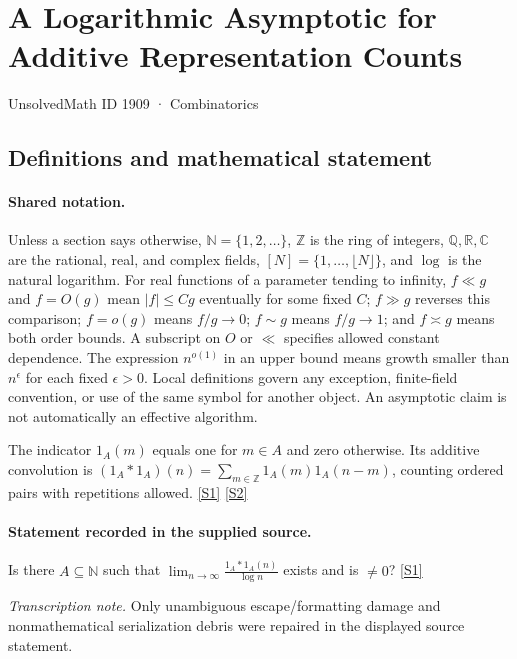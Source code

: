 \documentclass[11pt,a4paper]{article}
\newcommand{\N}{\mathbb{N}}
\newcommand{\Z}{\mathbb{Z}}
\newcommand{\Q}{\mathbb{Q}}
\newcommand{\R}{\mathbb{R}}
\newcommand{\C}{\mathbb{C}}
\newcommand{\sref}[2]{\hyperlink{source:#1:#2}{[S#2]}}
\begin{document}

\setcounter{section}{1908}

\section{A Logarithmic Asymptotic for Additive Representation Counts}\label{1909}

{\small\sffamily UnsolvedMath ID 1909 · Combinatorics}

\subsection{Definitions and mathematical statement}

\paragraph{Shared notation.}Unless a section says otherwise, $\N=\{1,2,\ldots\}$,
$\Z$ is the ring of integers, $\Q,\R,\C$ are the rational, real, and complex
fields, $[N]=\{1,\ldots,\lfloor N\rfloor\}$, and $\log$ is the natural
logarithm. For real functions of a parameter tending to infinity,
$f\ll g$ and $f=O(g)$ mean $|f|\leq Cg$ eventually for some fixed $C$;
$f\gg g$ reverses this comparison; $f=o(g)$ means $f/g\to0$;
$f\sim g$ means $f/g\to1$; and $f\asymp g$ means both order bounds.
A subscript on $O$ or $\ll$ specifies allowed constant dependence.
The expression $n^{o(1)}$ in an upper bound means growth smaller than
$n^\epsilon$ for each fixed $\epsilon>0$. Local definitions govern any
exception, finite-field convention, or use of the same symbol for another
object. An asymptotic claim is not automatically an effective algorithm.



The indicator $1_A(m)$ equals one for $m\in A$ and zero otherwise. Its additive convolution is $(1_A*1_A)(n)=\sum_{m\in\Z}1_A(m)1_A(n-m)$, counting ordered pairs with repetitions allowed. \sref{1909}{1} \sref{1909}{2}

\paragraph{Statement recorded in the supplied source.}
Is there $A\subseteq \mathbb{N}$ such that $ \lim_{n\to \infty}\frac{1_A\ast 1_A(n)}{\log n} $ exists and is $\neq 0$? \sref{1909}{1}

{\small\emph{Transcription note.} Only unambiguous escape/formatting damage and nonmathematical serialization debris were repaired in the displayed source statement.}
\end{document}
